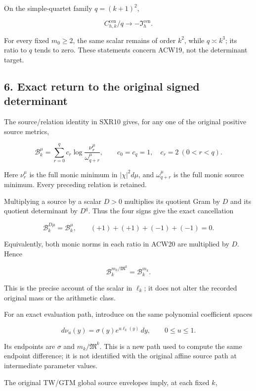 On the simple-quartet family \(q=(k+1)^2\),

\[
C_{h,k}^{\mathrm{cen}}/q\longrightarrow-\mathfrak I_h^{\mathrm{cen}}.
\]

For every fixed \(m_0\ge2\), the same scalar remains of order \(k^2\), while \(q\asymp k^3\); its ratio to \(q\) tends to zero. These statements concern ACW19, not the determinant target.

\subsection{6. Exact return to the original signed determinant}\label{acw:exact-return-to-the-original-signed-determinant}

The source/relation identity in SXR10 gives, for any one of the original positive source metrics,

\[
\mathcal B_k^\mu
=\sum_{r=0}^q c_r
\log\frac{\nu_r^\mu}{\omega_{q+r}^\mu},
\qquad c_0=c_q=1,\quad c_r=2\ (0<r<q).
\tag{ACW20}
\]

Here \(\nu_r^\mu\) is the full monic minimum in \(|\chi|^2d\mu\), and \(\omega_{q+r}^\mu\) is the full monic source minimum. Every preceding relation is retained.

Multiplying a source by a scalar \(D>0\) multiplies its quotient Gram by \(D\) and its quotient determinant by \(D^q\). Thus the four signs give the exact cancellation

\[
\mathcal B_k^{D\mu}=\mathcal B_k^\mu,
\qquad (+1)+(+1)+(-1)+(-1)=0.
\]

Equivalently, both monic norms in each ratio in ACW20 are multiplied by \(D\). Hence

\[
\mathcal B_k^{m_k/\mathfrak M^k}=\mathcal B_k^{m_k}.
\tag{ACW21}
\]

This is the precise account of the scalar in \(\ell_k\); it does not alter the recorded original mass or the arithmetic class.

For an exact evaluation path, introduce on the same polynomial coefficient spaces

\[
d\nu_u(y)=\sigma(y)e^{u\ell_k(y)}\,dy,
\qquad0\le u\le1.
\tag{ACW22}
\]

Its endpoints are \(\sigma\) and \(m_k/\mathfrak M^k\). This is a new path used to compute the same endpoint difference; it is not identified with the original affine source path at intermediate parameter values.

The original TW/GTM global source envelopes imply, at each fixed \(k\),

